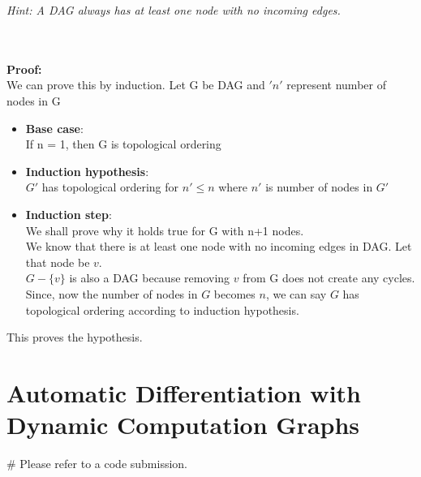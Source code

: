 \documentclass[a4paper,10pt]{article}
\begin{document}
\begin{enumerate}
\begin{taskbox}
    \emph{Hint: A DAG always has at least one node with no incoming edges.}
    \end{taskbox}
    \\ \\ \textbf{Proof:} \\
    We can prove this by induction. Let G be DAG and $'n'$ represent number of nodes in G\\
    \begin{itemize}
        \item \textbf{Base case}:
        \\ If n = 1, then G is topological ordering
        \item \textbf{Induction hypothesis}:
        \\ $G'$ has topological ordering for $n' \leq n$ where $n'$ is number of nodes in $G'$
        \item \textbf{Induction step}:
        \\ We shall prove why it holds true for G with n+1 nodes.
        \\ We know that there is at least one node with no incoming edges in DAG. Let that node be $v$.
        \\ $G - \{v\}$ is also a DAG because removing $v$ from G does not create any cycles.
        \\ Since, now the number of nodes in $G$ becomes $n$, we can say $G$ has topological ordering according to induction hypothesis.
    \end{itemize}
    This proves the hypothesis.
\end{enumerate}
\newpage
\section{Automatic Differentiation with Dynamic Computation Graphs}
\begin{enumerate}
   # Please refer to a code submission.
\end{enumerate}
\end{document}
